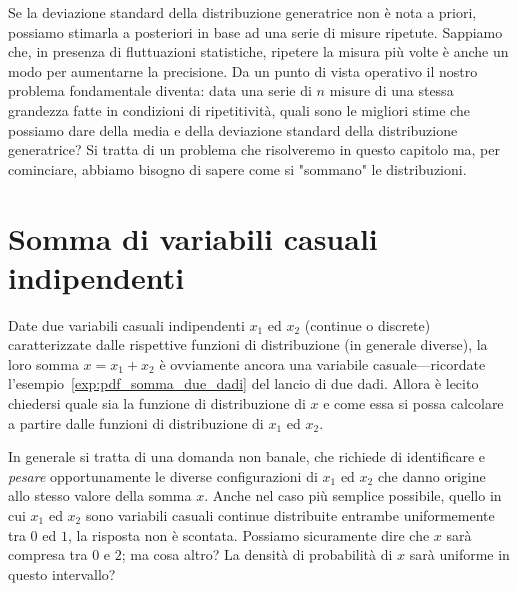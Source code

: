 Se la deviazione standard della distribuzione generatrice non è nota a priori,
possiamo stimarla a posteriori in base ad una serie di misure ripetute.
Sappiamo che, in presenza di fluttuazioni statistiche, ripetere la misura più
volte è anche un modo per aumentarne la precisione. Da un punto di vista
operativo il nostro problema fondamentale diventa: data una serie di $n$ misure
di una stessa grandezza fatte in condizioni di ripetitività, quali sono le
migliori stime che possiamo dare della media e della deviazione standard della
distribuzione generatrice? Si tratta di un problema che risolveremo in questo
capitolo ma, per cominciare, abbiamo bisogno di sapere come si "sommano" le
distribuzioni.


\section{Somma di variabili casuali indipendenti}
\label{sec:somma_variabili_indipendenti}

Date due variabili casuali indipendenti $x_1$ ed $x_2$ (continue o discrete)
caratterizzate dalle rispettive funzioni di distribuzione (in generale diverse),
la loro somma $x = x_1 + x_2$ è ovviamente ancora una variabile
casuale---ricordate l'esempio~\ref{exp:pdf_somma_due_dadi} del lancio di due
dadi. Allora è lecito chiedersi quale sia la funzione di distribuzione di
$x$ e come essa si possa calcolare a partire dalle funzioni di distribuzione
di $x_1$ ed $x_2$.

In generale si tratta di una domanda non banale, che richiede di identificare
e \emph{pesare} opportunamente le diverse configurazioni di $x_1$ ed $x_2$ che
danno origine allo stesso valore della somma $x$. Anche nel caso più semplice
possibile, quello in cui $x_1$ ed $x_2$ sono variabili casuali continue
distribuite entrambe uniformemente tra $0$ ed $1$, la risposta non è scontata.
Possiamo sicuramente dire che $x$ sarà compresa tra $0$ e $2$; ma cosa altro?
La densità di probabilità di $x$ sarà uniforme in questo intervallo?

